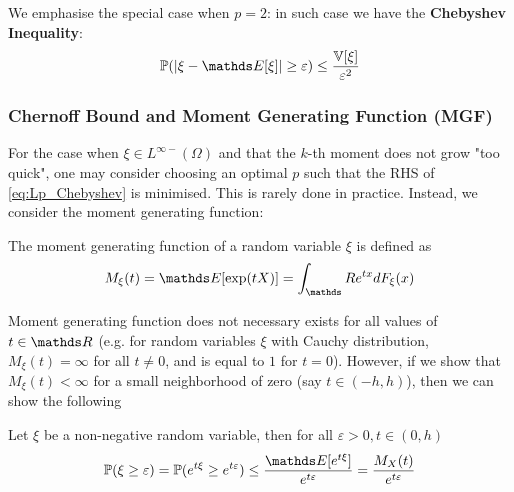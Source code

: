 We emphasise the special case when $p = 2$: in such case we have the \textbf{Chebyshev Inequality}:
\begin{equation} \label{eq:Chebyshev}
    \p(|\xi - \E[\xi]| \ge \varepsilon) \le \frac{\V[\xi]}{\varepsilon^2}
\end{equation}

\subsubsection{Chernoff Bound and Moment Generating Function (MGF)}

For the case when $\xi \in L^{\infty-}(\Omega)$ and that the $k$-th moment does not grow "too quick", one may consider choosing an optimal $p$ such that the RHS of \eqref{eq:Lp_Chebyshev} is minimised. This is rarely done in practice. Instead, we consider the moment generating function:
\begin{definition} The moment generating function of a random variable $\xi$ is defined as
\begin{equation}
    M_\xi(t) = \E[\exp(tX)] = \int_\R e^{tx} dF_\xi(x)
\end{equation}
\end{definition}

Moment generating function does not necessary exists for all values of $t \in \R$ (e.g. for random variables $\xi$ with Cauchy distribution, $M_\xi(t) = \infty$ for all $t \neq 0$, and is equal to $1$ for $t = 0$). However, if we show that $M_\xi(t) < \infty$ for a small neighborhood of zero (say $t \in (-h,h)$), then we can show the following

\begin{corollary}
Let $\xi$ be a non-negative random variable, then for all $\varepsilon > 0, t \in (0,h)$
\begin{equation} \label{eq:Chernoff}
    \p(\xi \ge \varepsilon) = \p(e^{t\xi} \ge e^{t\varepsilon}) \le \frac{\E[e^{t\xi}]}{e^{t\varepsilon}} = \frac{M_X(t)}{e^{t\varepsilon}}
\end{equation}
\end{corollary}

